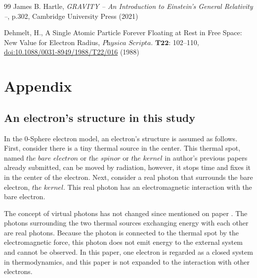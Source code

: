 \documentclass[%
 reprint,
 amsmath,amssymb,
 aps,
]{revtex4-1}
\numberwithin{equation}{section}%
\begin{document}
\begin{thebibliography}{99}
     James B. Hartle, \textit{GRAVITY -- An Introduction to Einstein's General Relativity --}, p.302, Cambridge University Press (2021)

     Dehmelt, H., A Single Atomic Particle Forever Floating at Rest in Free Space: New Value for Electron Radius, $\textit{Physica Scripta}$. $\textbf{T22}$: 102--110, \href{https://iopscience.iop.org/article/10.1088/0031-8949/1988/T22/016}{doi:10.1088/0031-8949/1988/T22/016} (1988)


\end{thebibliography}

\clearpage

\section{Appendix}
\label{Appendix}


\subsection{An electron’s structure in this study}
\label{An electron’s structure in this study}

        In the 0-Sphere electron model, an electron's structure is assumed as follows. First, consider there is a tiny thermal source in the center. This thermal spot, named $\textit{the bare electron}$ or $\textit{the spinor}$ or $\textit{the kernel}$ in author's previous papers already submitted, can be moved by radiation, however, it stops time and fixes it in the center of the electron. Next, consider a real photon that surrounds the bare electron, $\textit{the kernel}$. This real photon has an electromagnetic interaction with the bare electron.

        The concept of virtual photons has not changed since mentioned on paper \cite{Hanamura1}. The photons surrounding the two thermal sources exchanging energy with each other are real photons. Because the photon is connected to the thermal spot by the electromagnetic force, this photon does not emit energy to the external system and cannot be observed. In this paper, one electron is regarded as a closed system in thermodynamics, and this paper is not expanded to the interaction with other electrons.
        
\end{document}

